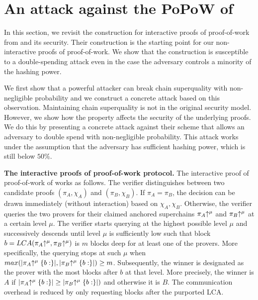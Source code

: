 \section{An attack against the PoPoW of \cite{KLS}}

In this section, we revisit the construction for interactive proofs of
proof-of-work from \cite{KLS} and its security.  Their construction is the
starting point for our non-interactive proofs of proof-of-work. We show that the
construction is susceptible to  a double-spending attack even in the case the
adversary controls a minority of the hashing power.

We first show that a powerful attacker can break chain superquality with
non-negligible probability and we construct a concrete attack based on this
observation. Maintaining chain superquality is not in the original
security model. However, we show how the property affects the security of the
underlying proofs. We do this by presenting a concrete attack against their
scheme that allows an adversary to double spend with non-negligible probability.
This attack works under the assumption that the adversary has sufficient hashing
power, which is still below $50\%$.

\noindent
\textbf{The interactive proofs of proof-of-work protocol.}
The interactive proof of proof-of-work of \cite{KLS} works as follows. The
verifier distinguishes between two candidate proofs $(\pi_A, \chi_A)$ and
$(\pi_B, \chi_B)$. If $\pi_A = \pi_B$, the decision can be drawn immediately
(without interaction) based on $\chi_A,\chi_B$. Otherwise, the verifier queries
the two provers for their claimed anchored superchains $\pi_A\negthickspace\uparrow^\mu$ and
$\pi_B\negthickspace\uparrow^\mu$ at a certain level $\mu$. The verifier starts querying at
the highest possible level $\mu$ and successively descends until level $\mu$ is
sufficiently low such that block $b = LCA(\pi_A\negthickspace\uparrow^\mu, \pi_B\negthickspace\uparrow^\mu)$
is $m$ blocks deep for at least one of the provers. More specifically, the
querying stops at such $\mu$ when $max(|\pi_A\negthickspace\uparrow^\mu\{b:\}|,
|\pi_B\negthickspace\uparrow^\mu\{b:\}|) \geq m$. Subsequently, the winner is designated as
the prover with the most blocks after $b$ at that level. More precisely, the
winner is $A$ if $|\pi_A\negthickspace\uparrow^\mu\{b:\}| \geq |\pi_B\negthickspace\uparrow^\mu\{b:\}|)$ and
otherwise it is $B$. The communication overhead is reduced by only requesting
blocks after the purported LCA.

